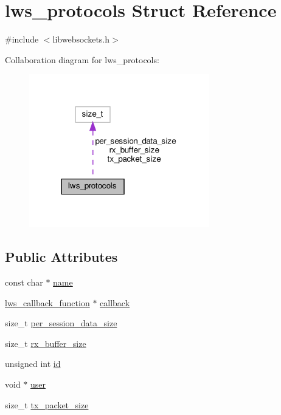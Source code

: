 \hypertarget{structlws__protocols}{}\section{lws\+\_\+protocols Struct Reference}
\label{structlws__protocols}


{\ttfamily \#include $<$libwebsockets.\+h$>$}



Collaboration diagram for lws\+\_\+protocols\+:
\nopagebreak
\begin{figure}[H]
\begin{center}
\leavevmode
\includegraphics[width=222pt]{structlws__protocols__coll__graph}
\end{center}
\end{figure}
\subsection*{Public Attributes}
\begin{DoxyCompactItemize}
\item 
const char $\ast$ \hyperlink{structlws__protocols_af285ada5293641ed6cd74a53fa8bbeb6}{name}
\item 
\hyperlink{group__usercb_gad4fcb82e68d60ffacca61a3f783a0a2f}{lws\+\_\+callback\+\_\+function} $\ast$ \hyperlink{structlws__protocols_a7fd66ba094ac0f54ea8b176264449fef}{callback}
\item 
size\+\_\+t \hyperlink{structlws__protocols_a9bbd85f591ffb4259711cb5acbb05bea}{per\+\_\+session\+\_\+data\+\_\+size}
\item 
size\+\_\+t \hyperlink{structlws__protocols_a0d1d4996d81b2f5e125bcec981e461c5}{rx\+\_\+buffer\+\_\+size}
\item 
unsigned int \hyperlink{structlws__protocols_a6b632018590c2b1bbe43fbab6d5e6fac}{id}
\item 
void $\ast$ \hyperlink{structlws__protocols_aa952f56d53a0f261e486507b59e433ec}{user}
\item 
size\+\_\+t \hyperlink{structlws__protocols_aa18feb18890dd1faab944ac92cae9187}{tx\+\_\+packet\+\_\+size}
\end{DoxyCompactItemize}


